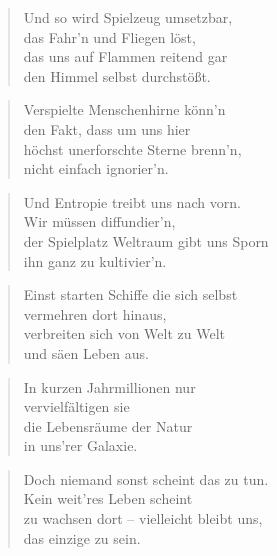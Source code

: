 \documentclass[10pt,a4paper]{article}
\begin{document}
\begin{multicols}{2}
\begin{verse}
Und so wird Spielzeug umsetzbar, \\
das Fahr’n und Fliegen löst, \\
das uns auf Flammen reitend gar \\
den Himmel selbst durchstößt. \\
\end{verse}

\begin{verse}
Verspielte Menschenhirne könn’n \\
den Fakt, dass um uns hier \\
höchst unerforschte Sterne brenn’n, \\
nicht einfach ignorier’n. \\
\end{verse}

\begin{verse}
Und Entropie treibt uns nach vorn. \\
Wir müssen diffundier’n, \\
der Spielplatz Weltraum gibt uns Sporn \\
ihn ganz zu kultivier’n. \\
\end{verse}

\begin{verse}
Einst starten Schiffe die sich selbst \\
vermehren dort hinaus, \\
verbreiten sich von Welt zu Welt \\
und säen Leben aus. \\
\end{verse}

\begin{verse}
In kurzen Jahrmillionen nur \\
vervielfältigen sie \\
die Lebensräume der Natur \\
in uns’rer Galaxie. \\
\end{verse}

\begin{verse}
Doch niemand sonst scheint das zu tun. \\
Kein weit’res Leben scheint \\
zu wachsen dort – vielleicht bleibt uns, \\
das einzige zu sein. \\
\end{verse}


\end{multicols}
\end{document}
